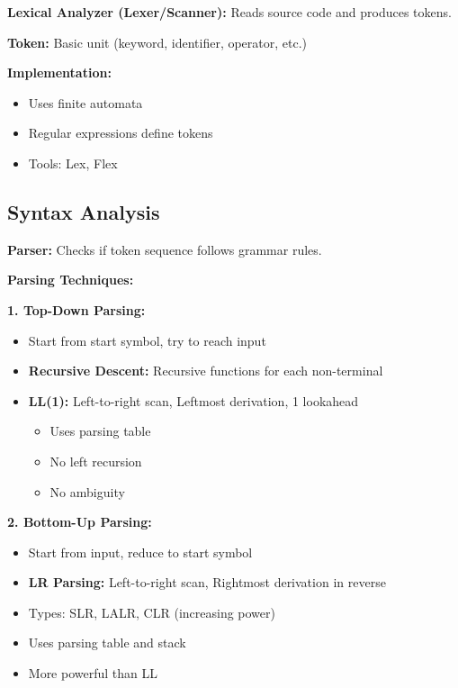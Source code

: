 \documentclass[11pt,a4paper]{article}
\begin{document}
\begin{defbox}
\textbf{Lexical Analyzer (Lexer/Scanner):} Reads source code and produces tokens.
\end{defbox}

\textbf{Token:} Basic unit (keyword, identifier, operator, etc.)

\textbf{Implementation:}
\begin{itemize}
    \item Uses finite automata
    \item Regular expressions define tokens
    \item Tools: Lex, Flex
\end{itemize}

\subsection{Syntax Analysis}

\begin{defbox}
\textbf{Parser:} Checks if token sequence follows grammar rules.
\end{defbox}

\textbf{Parsing Techniques:}

\textbf{1. Top-Down Parsing:}
\begin{itemize}
    \item Start from start symbol, try to reach input
    \item \textbf{Recursive Descent:} Recursive functions for each non-terminal
    \item \textbf{LL(1):} Left-to-right scan, Leftmost derivation, 1 lookahead
    \begin{itemize}
        \item Uses parsing table
        \item No left recursion
        \item No ambiguity
    \end{itemize}
\end{itemize}

\textbf{2. Bottom-Up Parsing:}
\begin{itemize}
    \item Start from input, reduce to start symbol
    \item \textbf{LR Parsing:} Left-to-right scan, Rightmost derivation in reverse
    \item Types: SLR, LALR, CLR (increasing power)
    \item Uses parsing table and stack
    \item More powerful than LL
\end{itemize}
\end{document}
